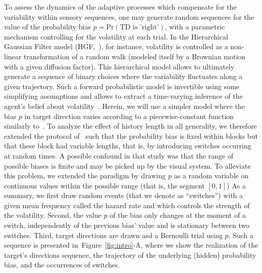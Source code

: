 \documentclass[12pt,english]{article}%
\newcommand{\citep}[1]{\parencite{#1}}
\newcommand{\citet}[1]{\textcite{#1}}
\newcommand{\seeFig}[1]{Figure~\ref{fig:#1}}
\begin{document}
To assess the dynamics of the adaptive processes
which compensate for the variability within sensory sequences,
one may generate random sequences for the value of the probability bias $p = \text{Pr}(\text{TD is 'right'})$,
with a parametric mechanism controlling for the volatility at each trial.
In the Hierarchical Gaussian Filter model (HGF,~\citet{Mathys11}), for instance,
volatility is controlled as a non-linear transformation
of a random walk (modeled itself by a Brownian motion with a given diffusion factor).
This hierarchical model allows to ultimately generate a sequence of binary choices
where the variability fluctuates along a given trajectory.
Such a forward probabilistic model is invertible
using some simplifying assumptions and allows
to extract a time-varying inference of the agent's belief about volatility~\citep{Vossel14}.
Herein, we will use a simpler model where
the bias $p$ in target direction varies according to a piecewise-constant function
similarly to~\citet{Meyniel13}.
To analyze the effect of history length in all generality,
we therefore extended the protocol of~\citep{Montagnini2010} such that the probability bias
is fixed within blocks but that these block had variable lengths,
that is, by introducing switches occurring at random times.
A possible confound in that study
was that the range of possible biases is finite and 
may be picked up by the visual system.
To alleviate this problem, we extended the paradigm
by drawing $p$ as a random variable on continuous values 
within the possible range (that is, the segment $[ 0, 1 ]$)
As a summary, we first draw random events (that we denote as ``switches'')
with a given mean frequency called the hazard rate and which controls the strength of the volatility.
Second, the value $p$ of the bias only changes at the moment of a switch,
independently of the previous bias' value
and is stationary between two switches.
Third, target directions are drawn asd a Bernoulli trial using $p$.
Such a sequence is presented in~\seeFig{intro}-A, 
where we show the realization of the target's directions sequence,
the trajectory of the underlying (hidden) probability bias, and
the occurrences of switches.
\end{document}

